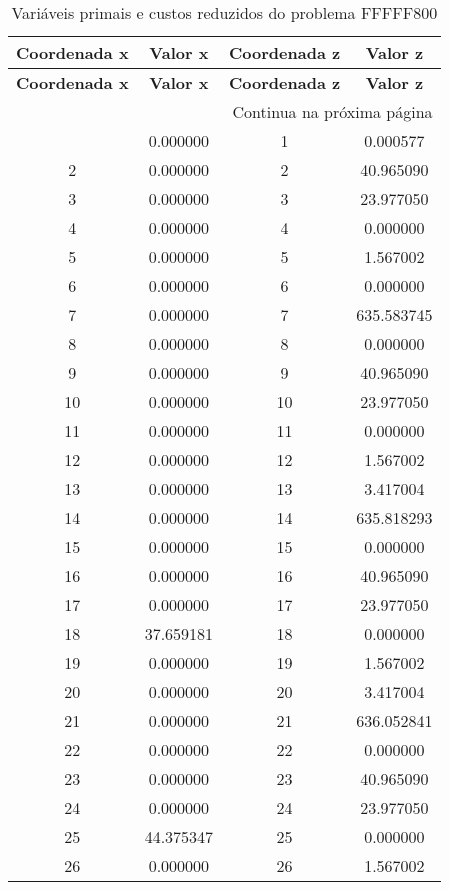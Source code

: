 \documentclass[12pt]{article}
\begin{document}
\begin{longtable}{@{}cccc@{}}
\caption{Variáveis primais e custos reduzidos do problema FFFFF800} \\
\toprule
\textbf{Coordenada x} & \textbf{Valor x} & \textbf{Coordenada z} & \textbf{Valor z} \\
\midrule
\endfirsthead

\toprule
\textbf{Coordenada x} & \textbf{Valor x} & \textbf{Coordenada z} & \textbf{Valor z} \\
\midrule
\endhead

\midrule \multicolumn{4}{r}{{Continua na próxima página}} \\ \midrule
\endfoot

\bottomrule
\endlastfoot
1 & 0.000000 & 1 & 0.000577 \\
2 & 0.000000 & 2 & 40.965090 \\
3 & 0.000000 & 3 & 23.977050 \\
4 & 0.000000 & 4 & 0.000000 \\
5 & 0.000000 & 5 & 1.567002 \\
6 & 0.000000 & 6 & 0.000000 \\
7 & 0.000000 & 7 & 635.583745 \\
8 & 0.000000 & 8 & 0.000000 \\
9 & 0.000000 & 9 & 40.965090 \\
10 & 0.000000 & 10 & 23.977050 \\
11 & 0.000000 & 11 & 0.000000 \\
12 & 0.000000 & 12 & 1.567002 \\
13 & 0.000000 & 13 & 3.417004 \\
14 & 0.000000 & 14 & 635.818293 \\
15 & 0.000000 & 15 & 0.000000 \\
16 & 0.000000 & 16 & 40.965090 \\
17 & 0.000000 & 17 & 23.977050 \\
18 & 37.659181 & 18 & 0.000000 \\
19 & 0.000000 & 19 & 1.567002 \\
20 & 0.000000 & 20 & 3.417004 \\
21 & 0.000000 & 21 & 636.052841 \\
22 & 0.000000 & 22 & 0.000000 \\
23 & 0.000000 & 23 & 40.965090 \\
24 & 0.000000 & 24 & 23.977050 \\
25 & 44.375347 & 25 & 0.000000 \\
26 & 0.000000 & 26 & 1.567002 \\

\end{longtable}
\end{document}
